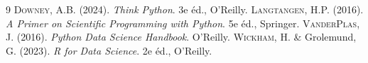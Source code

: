 \documentclass[12pt,a4paper,twoside]{book}
\theoremstyle{definition}
\theoremstyle{remark}
\begin{document}
\begin{thebibliography}{9}
 \textsc{Downey}, A.B. (2024). \emph{Think Python}. 3e \'ed., O'Reilly.
 \textsc{Langtangen}, H.P. (2016). \emph{A Primer on Scientific Programming with Python}. 5e \'ed., Springer.
 \textsc{VanderPlas}, J. (2016). \emph{Python Data Science Handbook}. O'Reilly.
 \textsc{Wickham}, H. \& Grolemund, G. (2023). \emph{R for Data Science}. 2e \'ed., O'Reilly.
\end{thebibliography}

\printindex
\end{document}
